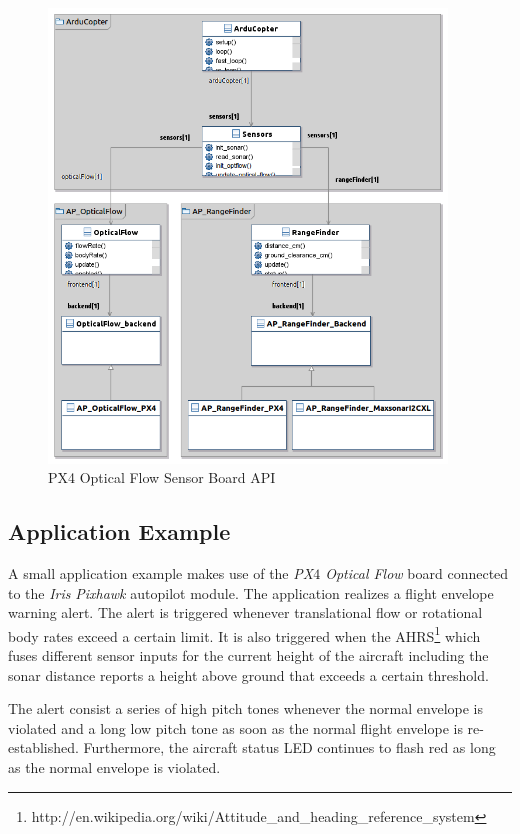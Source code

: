 \documentclass[paper=letter, fontsize=11pt]{scrartcl}
\numberwithin{equation}{section}
\numberwithin{figure}{section}
\numberwithin{table}{section}
\begin{document}
\begin{figure}[h]
	\centering
    \includegraphics[width=400px]{graphics/OpticalFlowDiagram.png}
	\caption{PX4 Optical Flow Sensor Board \ac{API}}
	\label{fig:of_sensor_board_api}
\end{figure}

\subsection{Application Example}
\label{sec:application_example}
\par
A small application example makes use of the {\em PX$4$ Optical Flow} board
connected to the {\em Iris} {\em Pixhawk} autopilot module. The application
realizes a flight envelope warning alert. The alert is triggered whenever
translational flow or rotational body rates exceed a certain limit. It is
also triggered when the \ac{AHRS}\footnote{
http://en.wikipedia.org/wiki/Attitude\_and\_heading\_reference\_system}
which fuses different sensor inputs for the current height of the aircraft
including the sonar distance reports a height above ground that exceeds a
certain threshold.

\par
The alert consist a series of high pitch tones whenever the normal envelope
is violated and a long low pitch tone as soon as the normal flight envelope
is re-established. Furthermore, the aircraft status \ac{LED} continues to
flash red as long as the normal envelope is violated.
\end{document}
